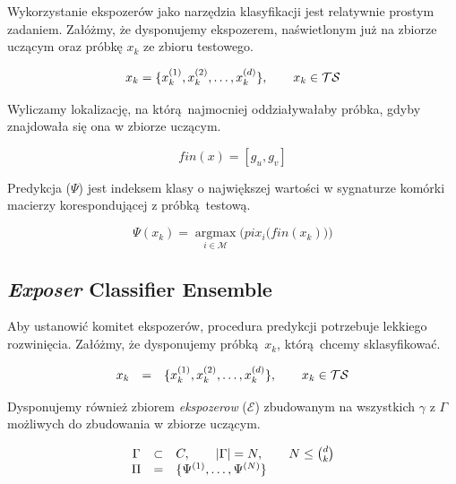 \documentclass[]{article}
\begin{document}
Wykorzystanie ekspozerów jako narzędzia klasyfikacji jest relatywnie prostym zadaniem. Załóżmy, że dysponujemy ekspozerem, naświetlonym już na zbiorze uczącym oraz próbkę $x_k$ ze zbioru testowego.

\begin{equation}
	\begin{array}[b]{l}
		x_k=\{x_k^{(1)}, x_k^{(2)}, \ldots, x_k^{(d)}\},\quad\quad x_k \in \mathcal{TS}
	\end{array}
\end{equation}

Wyliczamy lokalizację, na którą najmocniej oddziaływałaby próbka, gdyby znajdowała się ona w zbiorze uczącym.

\begin{equation}
	fin(x) = [g_u,g_v]
\end{equation}

Predykcja ($\Psi$) jest indeksem klasy o największej wartości w sygnaturze komórki macierzy korespondującej z próbką testową.

\begin{equation}
	\Psi(x_k) = \mathop{argmax}\limits_{i \in \mathcal{M}}\Bigg(pix_i\Big(fin(x_k)\Big)\Bigg)
\end{equation}

\subsection{\emph{Exposer} Classifier Ensemble}
\label{exposerclassifierensemble}

Aby ustanowić komitet ekspozerów, procedura predykcji potrzebuje lekkiego rozwinięcia. Załóżmy, że dysponujemy próbką $x_k$, którą chcemy sklasyfikować.

\begin{equation}
	\begin{array}[b]{cll}
		x_k &=&\{x_k^{(1)}, x_k^{(2)}, \ldots, x_k^{(d)}\},\quad\quad x_k \in \mathcal{TS}
	\end{array}
\end{equation}

Dysponujemy również zbiorem \emph{ekspozerow} ($\mathcal{E}$) zbudowanym na wszystkich $\gamma$ z $\Gamma$ możliwych do zbudowania w zbiorze uczącym.

\begin{equation}
	\begin{array}[b]{cll}
		\Gamma & \subset & C,\quad\quad |\Gamma| = N,\quad\quad N \leq {d \choose k}\\
		\Pi &=& \{\Psi^{(1)},\ldots,\Psi^{(N)}\}
	\end{array}
\end{equation}
\end{document}
